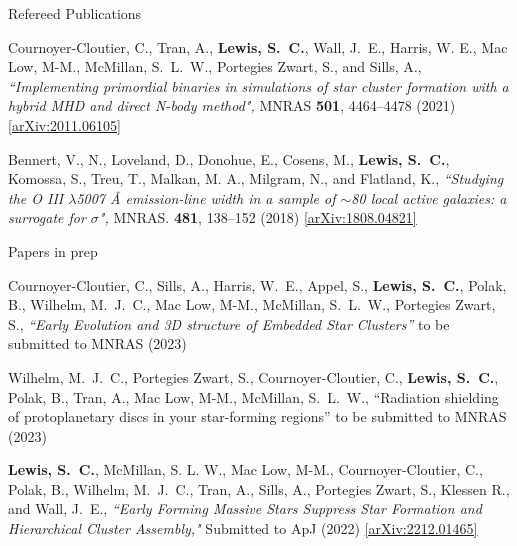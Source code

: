 \documentclass{resume} %
\begin{document}
\begin{rSection}{Refereed Publications}

\begin{etaremune}
 
\item {Cournoyer-Cloutier}, C., {Tran}, A., \textbf{{Lewis}, S.~C.}, {Wall}, J.~E., {Harris}, W. E., {Mac Low}, M-M., {McMillan}, S.~L.~W., {Portegies Zwart}, S., and {Sills}, A., \textit{``Implementing primordial binaries in simulations of star cluster formation with a hybrid MHD and direct N-body method",} MNRAS \textbf{501}, 4464--4478 (2021) \href{https://arxiv.org/abs/2011.06105}{[arXiv:2011.06105]}
  
\item {Bennert}, V., N., {Loveland}, D., {Donohue}, E., {Cosens}, M., \textbf{{Lewis}, S.~C.}, {Komossa}, S., {Treu}, T., {Malkan}, M. A., {Milgram}, N., and {Flatland}, K., \textit{``Studying the O III $\lambda$5007 Å emission-line width in a sample of $\sim$80 local active galaxies: a surrogate for $\sigma$",} MNRAS. \textbf{481}, 138--152 (2018) \href{https://arxiv.org/abs/1808.04821}{[arXiv:1808.04821]}
\end{etaremune}

\end{rSection}


\begin{rSection}{Papers in prep}
\begin{etaremune}
\item {Cournoyer-Cloutier}, C., {Sills}, A., {Harris}, W.~E., {Appel}, S., \textbf{{Lewis}, S.~C.}, {Polak}, B., {Wilhelm}, M.~J.~C., {Mac Low}, M-M., {McMillan}, S.~L.~W., {Portegies Zwart}, S., \textit{``Early Evolution and 3D structure of Embedded Star Clusters''} to be submitted to MNRAS (2023)

\item {Wilhelm}, M.~J.~C., {Portegies Zwart}, S., {Cournoyer-Cloutier}, C., \textbf{{Lewis}, S.~C.}, {Polak}, B., {Tran}, A., {Mac Low}, M-M., {McMillan}, S.~L.~W., ``Radiation shielding of protoplanetary discs in your star-forming regions'' to be submitted to MNRAS (2023)

\item \textbf{{Lewis}, S.~C.}, {McMillan}, S. L. W., {Mac Low}, M-M., {Cournoyer-Cloutier}, C., {Polak}, B., {Wilhelm}, M.~J.~C., {Tran}, A., {Sills}, A., {Portegies Zwart}, S., {Klessen} R., and {Wall}, J.~E., \textit{``Early Forming Massive Stars Suppress Star Formation and Hierarchical Cluster Assembly,"} Submitted to ApJ (2022) \href{https://arxiv.org/abs/2212.01465}{[arXiv:2212.01465]}

\end{etaremune}
\end{rSection}
\end{document}

